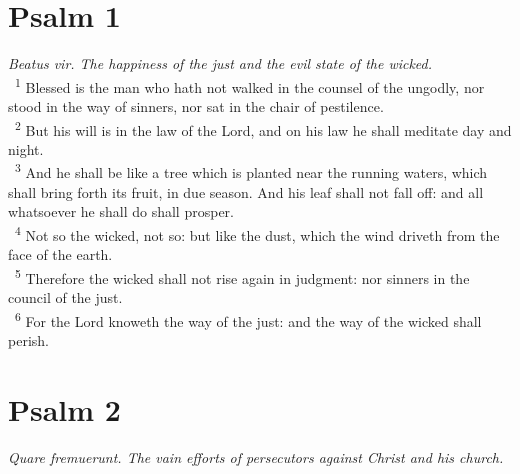 \documentclass[a5paper,12pt]{article}
\date{}
\title{}
\begin{document}
\begin{multicols*}{2}

\section{Psalm 1}
\label{sec:orgba1d875}
\emph{Beatus vir. The happiness of the just and the evil state of the wicked.}\\

~\textsuperscript{1} Blessed is the man who hath not walked in the counsel of the ungodly, nor stood in the way of sinners, nor sat in the chair of pestilence.\\
~\textsuperscript{2} But his will is in the law of the Lord, and on his law he shall meditate day and night.\\
~\textsuperscript{3} And he shall be like a tree which is planted near the running waters, which shall bring forth its fruit, in due season. And his leaf shall not fall off: and all whatsoever he shall do shall prosper.\\
~\textsuperscript{4} Not so the wicked, not so: but like the dust, which the wind driveth from the face of the earth.\\
~\textsuperscript{5} Therefore the wicked shall not rise again in judgment: nor sinners in the council of the just.\\
~\textsuperscript{6} For the Lord knoweth the way of the just: and the way of the wicked shall perish.\\

\section{Psalm 2}
\label{sec:orgd45e538}
\emph{Quare fremuerunt. The vain efforts of persecutors against Christ and his church.}\\


\end{multicols*}
\end{document}
